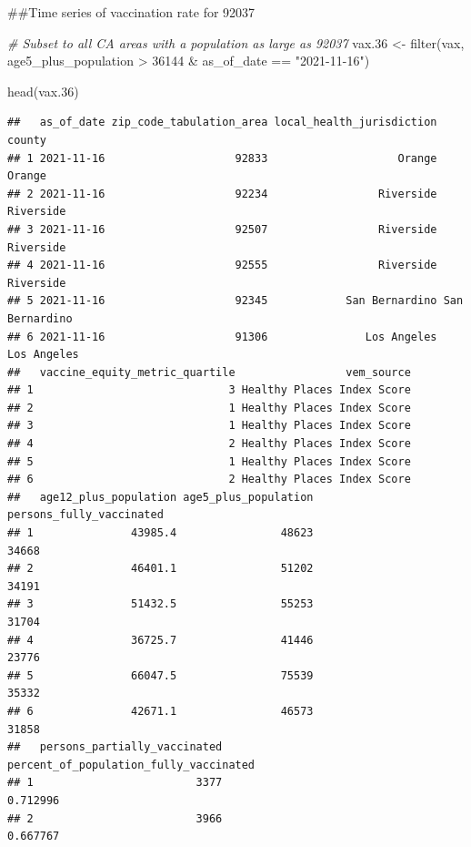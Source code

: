 \documentclass[
]{article}
\newenvironment{Shaded}{\begin{snugshade}}{\end{snugshade}}
\newcommand{\CommentTok}[1]{\textcolor[rgb]{0.56,0.35,0.01}{\textit{#1}}}
\newcommand{\DecValTok}[1]{\textcolor[rgb]{0.00,0.00,0.81}{#1}}
\newcommand{\FloatTok}[1]{\textcolor[rgb]{0.00,0.00,0.81}{#1}}
\newcommand{\FunctionTok}[1]{\textcolor[rgb]{0.00,0.00,0.00}{#1}}
\newcommand{\NormalTok}[1]{#1}
\newcommand{\OtherTok}[1]{\textcolor[rgb]{0.56,0.35,0.01}{#1}}
\newcommand{\SpecialCharTok}[1]{\textcolor[rgb]{0.00,0.00,0.00}{#1}}
\newcommand{\StringTok}[1]{\textcolor[rgb]{0.31,0.60,0.02}{#1}}
\begin{document}
\#\#Time series of vaccination rate for 92037

\begin{Shaded}
\begin{Highlighting}[]
\CommentTok{\# Subset to all CA areas with a population as large as 92037}
\NormalTok{vax}\FloatTok{.36} \OtherTok{\textless{}{-}} \FunctionTok{filter}\NormalTok{(vax, age5\_plus\_population }\SpecialCharTok{\textgreater{}} \DecValTok{36144} \SpecialCharTok{\&}
\NormalTok{                as\_of\_date }\SpecialCharTok{==} \StringTok{"2021{-}11{-}16"}\NormalTok{)}

\FunctionTok{head}\NormalTok{(vax}\FloatTok{.36}\NormalTok{)}
\end{Highlighting}
\end{Shaded}

\begin{verbatim}
##   as_of_date zip_code_tabulation_area local_health_jurisdiction         county
## 1 2021-11-16                    92833                    Orange         Orange
## 2 2021-11-16                    92234                 Riverside      Riverside
## 3 2021-11-16                    92507                 Riverside      Riverside
## 4 2021-11-16                    92555                 Riverside      Riverside
## 5 2021-11-16                    92345            San Bernardino San Bernardino
## 6 2021-11-16                    91306               Los Angeles    Los Angeles
##   vaccine_equity_metric_quartile                 vem_source
## 1                              3 Healthy Places Index Score
## 2                              1 Healthy Places Index Score
## 3                              1 Healthy Places Index Score
## 4                              2 Healthy Places Index Score
## 5                              1 Healthy Places Index Score
## 6                              2 Healthy Places Index Score
##   age12_plus_population age5_plus_population persons_fully_vaccinated
## 1               43985.4                48623                    34668
## 2               46401.1                51202                    34191
## 3               51432.5                55253                    31704
## 4               36725.7                41446                    23776
## 5               66047.5                75539                    35332
## 6               42671.1                46573                    31858
##   persons_partially_vaccinated percent_of_population_fully_vaccinated
## 1                         3377                               0.712996
## 2                         3966                               0.667767

\end{verbatim}
\end{document}
